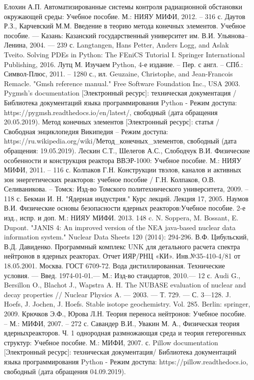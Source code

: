 \begin{thebibliography}{99}
	 Елохин А.П. Автоматизированные системы контроля радиационной обстановки окружающей среды: 
		Учебное пособие. М.: НИЯУ МИФИ, 2012. – 316 с.
	 Даутов Р.З., Карчевский М.М. Введение в теорию метода конечных элементов. Учебное пособие. — Казань: 
		Казанский государственный университет им. В.И. Ульянова–Ленина, 2004. — 239 с.
	 Langtangen, Hans Petter, Anders Logg, and Aslak Tveito. Solving PDEs in Python: The FEniCS 
		Tutorial I. Springer International Publishing, 2016.
	 Лутц М. Изучаем Python, 4-е издание. – Пер. с англ. – СПб.: Символ-Плюс, 2011. – 1280 с., ил.
	 Geuzaine, Christophe, and Jean-Francois Remacle. "Gmsh reference manual." Free Software 
		Foundation Inc., USA 2003.
	 Pygmsh's documentation [Электронный ресурс]: техническая документация / Библиотека документаций 
		языка программирования Python - Режим доступа: https://pygmsh.readthedocs.io/en/latest/, свободный (дата 
		обращения 20.05.2019).
	 Метод конечных элементов [Электронный ресурс]: статья / Свободная энциклопедия Википедия – Режим 
		доступа: https://ru.wikipedia.org/wiki/Метод\_конечных\_элементов, свободный (дата обращения: 19.05.2019).
	 Лескин С.Т., Шелегов А.С., Слободчук В.И. Физические особенности и конструкция реактора 
		ВВЭР-1000: Учебное пособие. М.: НИЯУ МИФИ, 2011. – 116 с.
	 Колпаков Г.Н. Конструкции твэлов, каналов и активных зон энергетических реакторов: учебное 
		пособие / Г.Н. Колпаков, О.В. Селиваникова. – Томск: Изд-во Томского политехнического университета, 2009. 
		– 118 с. 
	 Бекман И. Н. "Ядерная индустрия." Курс лекций. Лекция 17, 2005.
	 Наумов В.И. Физические основы безопасности ядерных реакторов:Учебное пособие. 2-е изд., испр. 
		и доп. М.: НИЯУ МИФИ. 2013. 148 c.
	 N. Soppera, M. Bossant, E. Dupont. "JANIS 4: An improved version of the NEA java-based nuclear data 
		information system." Nuclear Data Sheets 120 (2014): 294-296.
	 В.Ф. Цибульский, В.Д. Давиденко. Программный комплекс UNK для детального расчета спектра нейтронов в 
		ядерных реакторах. Отчет ИЯР/РНЦ «КИ». Инв.№35-410-4/81 от 18.05.2001. Москва.
	 ГОСТ 6709-72. Вода дистиллированная. Технические условия. — Введ. 1974-01-01.— М.: Изд-во 
		стандартов, 2010.— 12 с.
	 Audi G., Bersillon O., Blachot J., Wapstra A. H. The NUBASE evaluation of nuclear and decay properties 
		// Nuclear Physics A. — 2003. — Т. 729. — С. 3—128. 
	 J. Hoefs, J. Jochen, J. Hoefs. Stable isotope geochemistry. Vol. 285. Berlin: springer, 2009.
	 Крючков Э.Ф., Юрова Л.Н. Теория переноса нейтронов: Учебное пособие. – М.: МИФИ, 2007. – 272 с. 
	 Савандер В.И., Увакин М. А., Физическая теория ядерныхреакторов. Ч. 1 однородная размножающая среда 
		и теория гетерогенных структур: Учебное пособие. М.: МИФИ, 2007. с.
	 Pillow documentation [Электронный ресурс]: техническая документация/ Библиотека документаций языка программирования 
		Python - Режим доступа: https://pillow.readthedocs.io, свободный (дата обращения 04.09.2019).
\end{thebibliography}